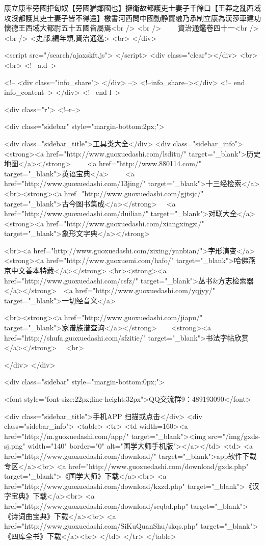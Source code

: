 康立康率旁國拒匈奴【旁國猶鄰國也】擁衛故都護吏士妻子千餘口【王莽之亂西域攻沒都護其吏士妻子皆不得還】檄書河西問中國動静竇融乃承制立康為漢莎車建功懷德王西域大都尉五十五國皆屬焉<br />
<br />
　　資治通鑑卷四十一<br />
<br />
<史部,編年類,資治通鑑>  <br>
   </div> 

<script src="/search/ajaxskft.js"> </script>
 <div class="clear"></div>
<br>
<br>
 <!-- a.d-->

 <!--
<div class="info_share">
</div> 
-->
 <!--info_share--></div>   <!-- end info_content-->
  </div> <!-- end l-->

<div class="r">   <!--r-->



<div class="sidebar"  style="margin-bottom:2px;">

 
<div class="sidebar_title">工具类大全</div>
<div class="sidebar_info">
<strong><a href="http://www.guoxuedashi.com/lsditu/" target="_blank">历史地图</a></strong>　　
<a href="http://www.880114.com/" target="_blank">英语宝典</a>　　
<a href="http://www.guoxuedashi.com/13jing/" target="_blank">十三经检索</a>　
<br><strong><a href="http://www.guoxuedashi.com/gjtsjc/" target="_blank">古今图书集成</a></strong>　
<a href="http://www.guoxuedashi.com/duilian/" target="_blank">对联大全</a>　<strong><a href="http://www.guoxuedashi.com/xiangxingzi/" target="_blank">象形文字典</a></strong>　

<br><a href="http://www.guoxuedashi.com/zixing/yanbian/">字形演变</a>　　<strong><a href="http://www.guoxuemi.com/hafo/" target="_blank">哈佛燕京中文善本特藏</a></strong>
<br><strong><a href="http://www.guoxuedashi.com/csfz/" target="_blank">丛书&方志检索器</a></strong>　<a href="http://www.guoxuedashi.com/yqjyy/" target="_blank">一切经音义</a>　　

<br><strong><a href="http://www.guoxuedashi.com/jiapu/" target="_blank">家谱族谱查询</a></strong>　　<strong><a href="http://shufa.guoxuedashi.com/sfzitie/" target="_blank">书法字帖欣赏</a></strong>　
<br>

</div>
</div>


<div class="sidebar" style="margin-bottom:0px;">

<font style="font-size:22px;line-height:32px">QQ交流群9：489193090</font>


<div class="sidebar_title">手机APP 扫描或点击</div>
<div class="sidebar_info">
<table>
<tr>
	<td width=160><a href="http://m.guoxuedashi.com/app/" target="_blank"><img src="/img/gxds-sj.png" width="140"  border="0" alt="国学大师手机版"></a></td>
	<td>
<a href="http://www.guoxuedashi.com/download/" target="_blank">app软件下载专区</a><br>
<a href="http://www.guoxuedashi.com/download/gxds.php" target="_blank">《国学大师》下载</a><br>
<a href="http://www.guoxuedashi.com/download/kxzd.php" target="_blank">《汉字宝典》下载</a><br>
<a href="http://www.guoxuedashi.com/download/scqbd.php" target="_blank">《诗词曲宝典》下载</a><br>
<a href="http://www.guoxuedashi.com/SiKuQuanShu/skqs.php" target="_blank">《四库全书》下载</a><br>
</td>
</tr>
</table>

